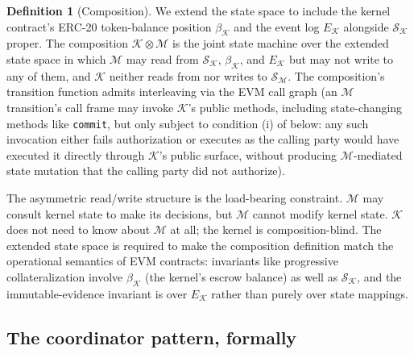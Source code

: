 \documentclass[11pt,a4paper]{article}
\theoremstyle{definition}
\newtheorem{definition}[theorem]{Definition}
\theoremstyle{remark}
\begin{document}
\begin{definition}[Composition]
\label{def:composition}
We extend the state space to include the kernel contract's
ERC-20 token-balance position $\beta_{\mathcal{K}}$ and the
event log $E_{\mathcal{K}}$ alongside $\mathcal{S}_{\mathcal{K}}$
proper. The composition $\mathcal{K} \otimes \mathcal{M}$ is the
joint state machine over the extended state space in which
$\mathcal{M}$ may read from $\mathcal{S}_{\mathcal{K}}$,
$\beta_{\mathcal{K}}$, and $E_{\mathcal{K}}$ but may not write to
any of them, and $\mathcal{K}$ neither reads from nor writes to
$\mathcal{S}_{\mathcal{M}}$. The composition's transition function
admits interleaving via the EVM call graph (an
$\mathcal{M}$ transition's call frame may invoke
$\mathcal{K}$'s public methods, including state-changing methods
like \texttt{commit}, but only subject to condition (i) of
 below: any such invocation either fails
authorization or executes as the calling party would have
executed it directly through $\mathcal{K}$'s public surface,
without producing $\mathcal{M}$-mediated state mutation that the
calling party did not authorize).
\end{definition}

The asymmetric read/write structure is the load-bearing constraint.
$\mathcal{M}$ may consult kernel state to make its decisions, but
$\mathcal{M}$ cannot modify kernel state. $\mathcal{K}$ does not
need to know about $\mathcal{M}$ at all; the kernel is
composition-blind. The extended state space is required to make
the composition definition match the operational semantics of
EVM contracts: invariants like progressive collateralization
involve $\beta_{\mathcal{K}}$ (the kernel's escrow balance) as
well as $\mathcal{S}_{\mathcal{K}}$, and the immutable-evidence
invariant is over $E_{\mathcal{K}}$ rather than purely over
state mappings.

\subsection{The coordinator pattern, formally}
\end{document}
